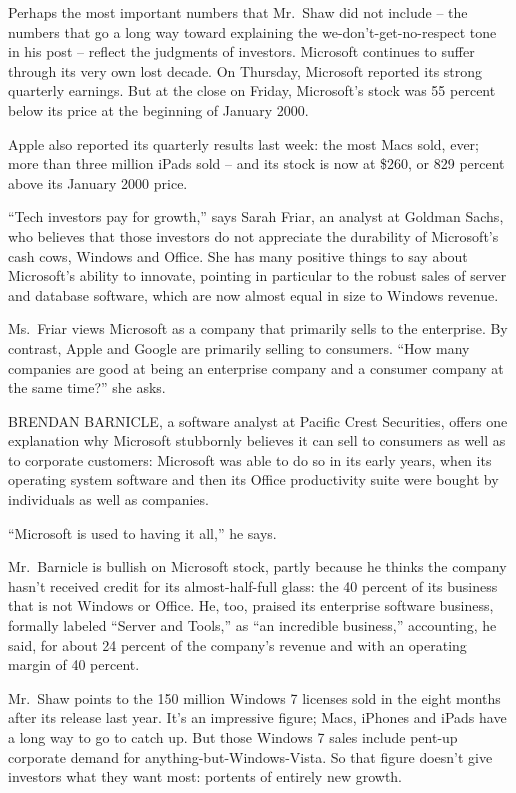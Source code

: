 ﻿\documentclass[12pt]{article}
\begin{document}
Perhaps the most important numbers that Mr.~Shaw did not include -- the numbers that go a long way
toward explaining the we-don't-get-no-respect tone in his post -- reflect the judgments of
investors. Microsoft continues to suffer through its very own lost decade. On Thursday, Microsoft
reported its strong quarterly earnings. But at the close on Friday, Microsoft's stock was 55 percent
below its price at the beginning of January 2000.

Apple also reported its quarterly results last week: the most Macs sold, ever; more than three
million iPads sold -- and its stock is now at \$260, or 829 percent above its January 2000 price.

``Tech investors pay for growth,'' says Sarah Friar, an analyst at Goldman Sachs, who believes that
those investors do not appreciate the durability of Microsoft's cash cows, Windows and Office. She
has many positive things to say about Microsoft's ability to innovate, pointing in particular to the
robust sales of server and database software, which are now almost equal in size to Windows revenue.

Ms.~Friar views Microsoft as a company that primarily sells to the enterprise. By contrast, Apple
and Google are primarily selling to consumers. ``How many companies are good at being an enterprise
company and a consumer company at the same time?'' she asks.

BRENDAN BARNICLE, a software analyst at Pacific Crest Securities, offers one explanation why
Microsoft stubbornly believes it can sell to consumers as well as to corporate customers: Microsoft
was able to do so in its early years, when its operating system software and then its Office
productivity suite were bought by individuals as well as companies.

``Microsoft is used to having it all,'' he says.

Mr.~Barnicle is bullish on Microsoft stock, partly because he thinks the company hasn't received
credit for its almost-half-full glass: the 40 percent of its business that is not Windows or Office.
He, too, praised its enterprise software business, formally labeled ``Server and Tools,'' as ``an
incredible business,'' accounting, he said, for about 24 percent of the company's revenue and with
an operating margin of 40 percent.

Mr.~Shaw points to the 150 million Windows 7 licenses sold in the eight months after its release
last year. It's an impressive figure; Macs, iPhones and iPads have a long way to go to catch up. But
those Windows 7 sales include pent-up corporate demand for anything-but-Windows-Vista. So that
figure doesn't give investors what they want most: portents of entirely new growth.
\end{document}
